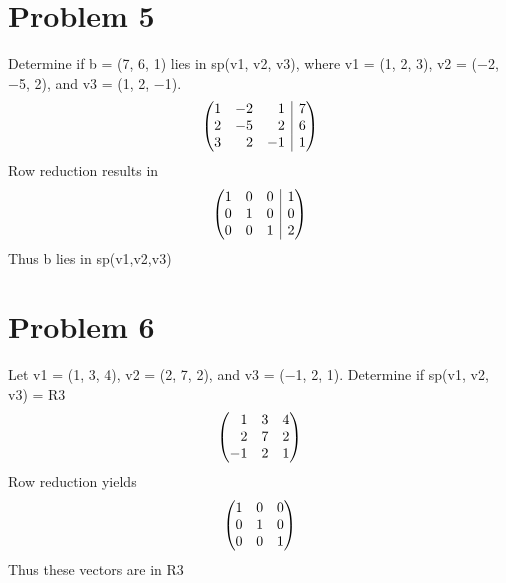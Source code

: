 \documentclass[11pt,a4paper,openany]{report}
\makeatletter
\newenvironment{sysmatrix}[1]
 {\left(\begin{array}{@{}#1@{}}}
 {\end{array}\right)}
\makeatother
\begin{document}
\section{Problem 5}
Determine if b = (7, 6, 1) lies in sp(v1, v2, v3), where v1 = (1, 2, 3), v2 =
(−2, −5, 2), and v3 = (1, 2, −1).
\begin{alignat*}{2}
\begin{sysmatrix}{rrr|r}
1 & -2 & 1 & 7\\
2 & -5 & 2 & 6\\
3 & 2 & -1 & 1\\
\end{sysmatrix}
\end{alignat*}
Row reduction results in
\begin{alignat*}{2}
\begin{sysmatrix}{rrr|r}
1 & 0 & 0 & 1\\
0 & 1 & 0 & 0\\
0 & 0 & 1 & 2\\
\end{sysmatrix}
\end{alignat*}
Thus b lies in sp(v1,v2,v3)



\newpage
\section{Problem 6}
Let v1 = (1, 3, 4), v2 = (2, 7, 2), and v3 = (−1, 2, 1). Determine if sp(v1, v2, v3) = R3
\begin{alignat*}{2}
\begin{sysmatrix}{rrr}
1 & 3 & 4\\
2 & 7 & 2\\
-1 & 2 & 1\\
\end{sysmatrix}
\end{alignat*}
Row reduction yields
\begin{alignat*}{2}
\begin{sysmatrix}{rrr}
1 & 0 & 0\\
0 & 1 & 0\\
0 & 0 & 1\\
\end{sysmatrix}
\end{alignat*}
Thus these vectors are in R3
\end{document}
